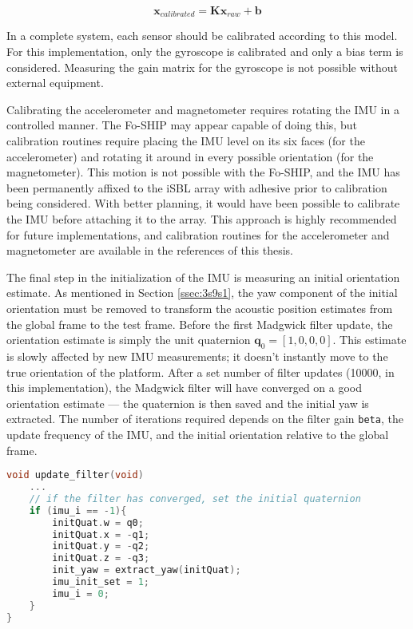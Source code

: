 \documentclass[11pt]{ucthesisCP}
\begin{document}
\begin{equation} \label{eq:compf}
	\mathbf{x}_{calibrated} = \mathbf{K}\mathbf{x}_{raw} + \mathbf{b}
\end{equation}

In a complete system, each sensor should be calibrated according to this model. For this implementation, only the gyroscope is calibrated and only a bias term is considered. Measuring the gain matrix for the gyroscope is not possible without external equipment.

Calibrating the accelerometer and magnetometer requires rotating the IMU in a controlled manner. The Fo-SHIP may appear capable of doing this, but calibration routines require placing the IMU level on its six faces (for the accelerometer) and rotating it around in every possible orientation (for the magnetometer). This motion is not possible with the Fo-SHIP, and the IMU has been permanently affixed to the iSBL array with adhesive prior to calibration being considered. With better planning, it would have been possible to calibrate the IMU before attaching it to the array. This approach is highly recommended for future implementations, and calibration routines for the accelerometer \cite{imucal} and magnetometer \cite{magcal} are available in the references of this thesis.

The final step in the initialization of the IMU is measuring an initial orientation estimate. As mentioned in Section \ref{ssec:3s9s1}, the yaw component of the initial orientation must be removed to transform the acoustic position estimates from the global frame to the test frame. Before the first Madgwick filter update, the orientation estimate is simply the unit quaternion \(\mathbf{q}_0 = [1, 0, 0, 0]\). This estimate is slowly affected by new IMU measurements; it doesn’t instantly move to the true orientation of the platform. After a set number of filter updates (10000, in this implementation), the Madgwick filter will have converged on a good orientation estimate --- the quaternion is then saved and the initial yaw is extracted. The number of iterations required depends on the filter gain \verb|beta|, the update frequency of the IMU, and the initial orientation relative to the global frame.

\begin{lstlisting}[language=C++]
void update_filter(void)
	...
	// if the filter has converged, set the initial quaternion
	if (imu_i == -1){
		initQuat.w = q0;
		initQuat.x = -q1;
		initQuat.y = -q2;
		initQuat.z = -q3;
		init_yaw = extract_yaw(initQuat);
		imu_init_set = 1;
		imu_i = 0;
	}
}
\end{lstlisting}
\end{document}
